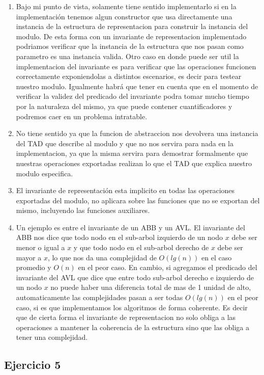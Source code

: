 \documentclass[10pt, a4paper]{report}
\begin{document}
\begin{enumerate}
 \item Bajo mi punto de vista, solamente tiene sentido implementarlo si en la implementaci\'on tenemos algun constructor que usa directamente una instancia de la estructura de representacion para construir la instancia del modulo. De esta forma con un invariante de representacion implementado podriamos verificar que la instancia de la estructura que nos pasan como parametro es una instancia valida. Otro caso en donde puede ser util la implementacion del invariante es para verificar que las operaciones funcionen correctamente exponiendolas a distintos escenarios, es decir para testear nuestro modulo. Igualmente habr\'a que tener en cuenta que en el momento de verificar la validez del predicado del invariante podra tomar mucho tiempo por la naturaleza del mismo, ya que puede contener cuantificadores y podremos caer en un problema intratable.
 \item No tiene sentido ya que la funcion de abstraccion nos devolvera una instancia del TAD que describe al modulo y que no nos servira para nada en la implementacion, ya que la misma servira para demostrar formalmente que nuestras operaciones exportadas realizan lo que el TAD que explica nuestro modulo especifica.
 \item El invariante de representaci\'on esta implicito en todas las operaciones exportadas del modulo, no aplicara sobre las funciones que no se exportan del mismo, incluyendo las funciones auxiliares.
 \item Un ejemplo es entre el invariante de un ABB y un AVL. El invariante del ABB nos dice que todo nodo en el sub-arbol izquierdo de un nodo $x$ debe ser menor o igual a $x$ y que todo nodo en el sub-arbol derecho de $x$ debe ser mayor a $x$, lo que nos da una complejidad de $O(lg(n))$ en el caso promedio y $O(n)$ en el peor caso. En cambio, si agregamos el predicado del invariante del AVL que dice que entre todo sub-arbol derecho e izquierdo de un nodo $x$ no puede haber una diferencia total de mas de 1 unidad de alto, automaticamente las complejidades pasan a ser todas $O(lg(n))$ en el peor caso, si es que implementamos los algoritmos de forma coherente. Es decir que de cierta forma el invariante de representacion no solo obliga a las operaciones a mantener la coherencia de la estructura sino que las obliga a tener una complejidad.
\end{enumerate}

\subsection*{Ejercicio 5}
\end{document}
